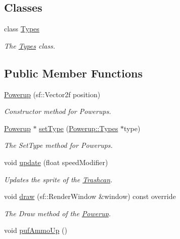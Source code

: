 \subsection*{Classes}
\begin{DoxyCompactItemize}
\item 
class \hyperlink{class_powerup_1_1_types}{Types}
\begin{DoxyCompactList}\small\item\em The \hyperlink{class_powerup_1_1_types}{Types} class. \end{DoxyCompactList}\end{DoxyCompactItemize}
\subsection*{Public Member Functions}
\begin{DoxyCompactItemize}
\item 
\hyperlink{class_powerup_aa34648f5c4ba210907d8fce12bbd9418}{Powerup} (sf\+::\+Vector2f position)
\begin{DoxyCompactList}\small\item\em Constructor method for Powerups. \end{DoxyCompactList}\item 
\hyperlink{class_powerup}{Powerup} $\ast$ \hyperlink{class_powerup_a822d237174578c8676f8a0a0f59133ff}{set\+Type} (\hyperlink{class_powerup_1_1_types}{Powerup\+::\+Types} $\ast$type)
\begin{DoxyCompactList}\small\item\em The Set\+Type method for Powerups. \end{DoxyCompactList}\item 
void \hyperlink{class_powerup_a9e2f40a979bbc15787a607871b6644ce}{update} (float speed\+Modifier)
\begin{DoxyCompactList}\small\item\em Updates the sprite of the \hyperlink{class_trashcan}{Trashcan}. \end{DoxyCompactList}\item 
void \hyperlink{class_powerup_a45236cc82ed3630d2b9b3494fe76c7f3}{draw} (sf\+::\+Render\+Window \&window) const override
\begin{DoxyCompactList}\small\item\em The Draw method of the \hyperlink{class_powerup}{Powerup}. \end{DoxyCompactList}\item 
void \hyperlink{class_powerup_aa5f2feab96d60c8a2d924ba7310f236c}{puf\+Ammo\+Up} ()

\end{DoxyCompactItemize}
